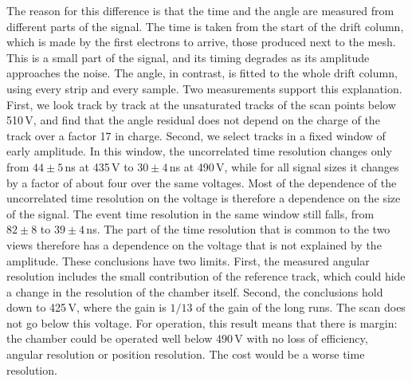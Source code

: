 The reason for this difference is that the time and the angle are measured from different parts of the signal. The
time is taken from the start of the drift column, which is made by the first electrons to arrive, those produced
next to the mesh. This is a small part of the signal, and its timing degrades as its amplitude approaches the noise.
The angle, in contrast, is fitted to the whole drift column, using every strip and every sample. Two measurements
support this explanation. First, we look track by track at the unsaturated tracks of the scan points below 510\,V,
and find that the angle residual does not depend on the charge of the track over a factor 17 in charge. Second, we
select tracks in a fixed window of early amplitude. In this window, the uncorrelated time resolution changes only
from $44\pm5$\,ns at 435\,V to $30\pm4$\,ns at 490\,V, while for all signal sizes it changes by a factor of about
four over the same voltages. Most of the dependence of the uncorrelated time resolution on the voltage is therefore
a dependence on the size of the signal. The event time resolution in the same window still falls, from $82\pm8$ to
$39\pm4$\,ns. The part of the time resolution that is common to the two views therefore has a dependence on the
voltage that is not explained by the amplitude.
These conclusions have two limits. First, the measured angular resolution includes the small contribution of the
reference track, which could hide a change in the resolution of the chamber itself. Second, the conclusions hold
down to 425\,V, where the gain is $1/13$ of the gain of the long runs. The scan does not go below this voltage. For
operation, this result means that there is margin: the chamber could be operated well below 490\,V with no loss of
efficiency, angular resolution or position resolution. The cost would be a worse time resolution.

